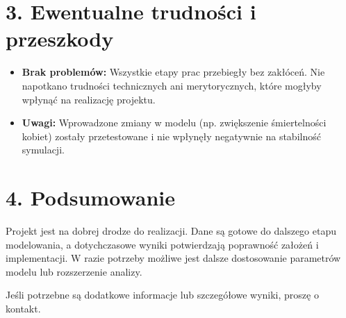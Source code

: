 \documentclass[a4paper,12pt]{article}
\begin{document}
\section*{3. Ewentualne trudności i przeszkody}
\begin{itemize}
    \item \textbf{Brak problemów:} Wszystkie etapy prac przebiegły bez zakłóceń. Nie napotkano trudności technicznych ani merytorycznych, które mogłyby wpłynąć na realizację projektu.
    \item \textbf{Uwagi:} Wprowadzone zmiany w modelu (np. zwiększenie śmiertelności kobiet) zostały przetestowane i nie wpłynęły negatywnie na stabilność symulacji.
\end{itemize}

\section*{4. Podsumowanie}
Projekt jest na dobrej drodze do realizacji. Dane są gotowe do dalszego etapu modelowania, a dotychczasowe wyniki potwierdzają poprawność założeń i implementacji. W razie potrzeby możliwe jest dalsze dostosowanie parametrów modelu lub rozszerzenie analizy.

\vspace{1cm}
\noindent Jeśli potrzebne są dodatkowe informacje lub szczegółowe wyniki, proszę o kontakt.
\end{document}
